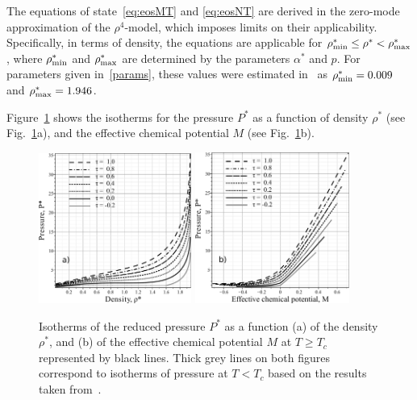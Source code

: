 The equations of state~\eqref{eq:eosMT} and \eqref{eq:eosNT} are derived in the zero-mode approximation of the $\rho^4$-model, which imposes limits on their applicability. Specifically, in terms of density, the equations are  applicable for $\rho^*_{\rm min} \leq \rho^* < \rho^*_{\rm max}$, where $\rho^*_{\rm min}$ and $\rho^*_{\rm max}$ are determined by the parameters $\alpha^*$ and $p$. For parameters given in~\eqref{params}, these values were estimated in~\cite{KozlovskiiDobush2020} as $\rho^*_{\rm min} = 0.009$ and $\rho^*_{\rm max} = 1.946$.

Figure~\ref{fig1} shows the isotherms for the pressure $P^*$ as a function of density $\rho^*$ (see Fig.~\ref{fig1}a), and the effective chemical potential $M$ (see Fig.~\ref{fig1}b).
\begin{figure}[h!]
	\includegraphics[width=0.446\textwidth]{f1a1.pdf} 
	\includegraphics[width=0.45\textwidth]{f1b1.pdf} 
	\vskip-3mm
	\caption{Isotherms of the reduced pressure $P^*$ as a function (a) of the density $\rho^*$, and (b) of the effective chemical potential $M$ at $T \geq T_c$ represented by black lines. Thick grey lines on both figures correspond to isotherms of pressure at $T < T_c$ based on the results taken from~\cite{KozlovskiiDobush2020}.
	}
	\label{fig1}
\end{figure}

